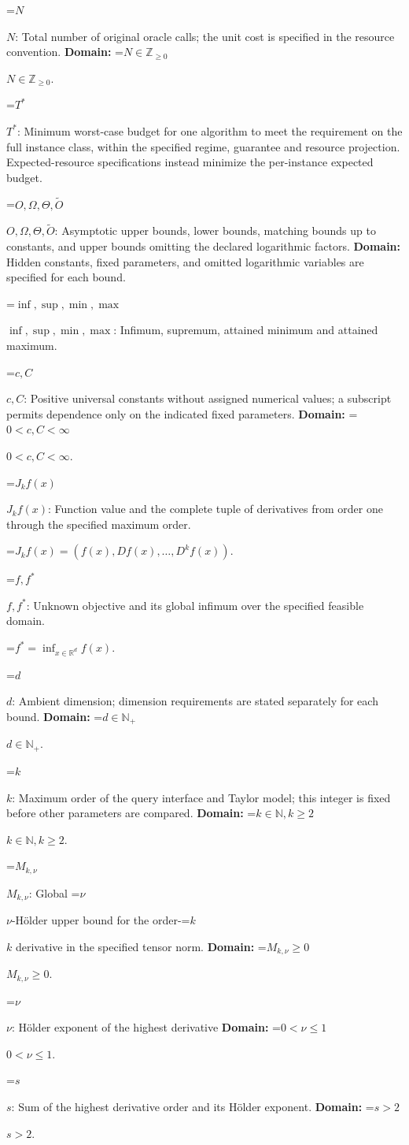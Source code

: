 \documentclass[10pt,a4paper]{article}
\newcommand{\AtlasMath}[1]{\par\begingroup\centering\setbox0=\hbox{$\displaystyle #1$}\ifdim\wd0>1.4\linewidth\typeout{ATLAS WIDE FORMULA: \the\wd0}\fi\ifdim\wd0>\linewidth\resizebox{\linewidth}{!}{\box0}\else\box0\fi\par\endgroup}
\newcommand{\AtlasInlineMath}[1]{\begingroup\setbox0=\hbox{$#1$}\ifdim\wd0>.4\linewidth\endgroup\AtlasMath{#1}\else\endgroup$#1$\fi}
\begin{document}
\AtlasInlineMath{N}: Total number of original oracle calls; the unit cost is specified in the resource convention. \textbf{Domain:} \AtlasInlineMath{N\in\mathbb{Z}_{\ge0}}.

\AtlasInlineMath{T^*}: Minimum worst-case budget for one algorithm to meet the requirement on the full instance class, within the specified regime, guarantee and resource projection. Expected-resource specifications instead minimize the per-instance expected budget.

\AtlasInlineMath{O,\Omega,\Theta,\widetilde{O}}: Asymptotic upper bounds, lower bounds, matching bounds up to constants, and upper bounds omitting the declared logarithmic factors. \textbf{Domain:} Hidden constants, fixed parameters, and omitted logarithmic variables are specified for each bound.

\AtlasInlineMath{\inf,\sup,\min,\max}: Infimum, supremum, attained minimum and attained maximum.

\AtlasInlineMath{c,C}: Positive universal constants without assigned numerical values; a subscript permits dependence only on the indicated fixed parameters. \textbf{Domain:} \AtlasInlineMath{0<c,C<\infty}.

\AtlasInlineMath{J_{k}f(x)}: Function value and the complete tuple of derivatives from order one through the specified maximum order.


\AtlasMath{J_{k}f(x)=(f(x),Df(x),\ldots,D^{k}f(x)).}


\AtlasInlineMath{f,f^*}: Unknown objective and its global infimum over the specified feasible domain.


\AtlasMath{f^*=\inf_{x\in \mathbb{R}^d}f(x).}


\AtlasInlineMath{d}: Ambient dimension; dimension requirements are stated separately for each bound. \textbf{Domain:} \AtlasInlineMath{d\in\mathbb{N}_{+}}.

\AtlasInlineMath{k}: Maximum order of the query interface and Taylor model; this integer is fixed before other parameters are compared. \textbf{Domain:} \AtlasInlineMath{k\in\mathbb{N}, k\ge2}.

\AtlasInlineMath{M_{k,\nu}}: Global \AtlasInlineMath{\nu}-Hölder upper bound for the order-\AtlasInlineMath{k} derivative in the specified tensor norm. \textbf{Domain:} \AtlasInlineMath{M_{k,\nu}\ge0}.

\AtlasInlineMath{\nu}: Hölder exponent of the highest derivative \textbf{Domain:} \AtlasInlineMath{0<\nu\le1}.

\AtlasInlineMath{s}: Sum of the highest derivative order and its Hölder exponent. \textbf{Domain:} \AtlasInlineMath{s>2}.
\end{document}
